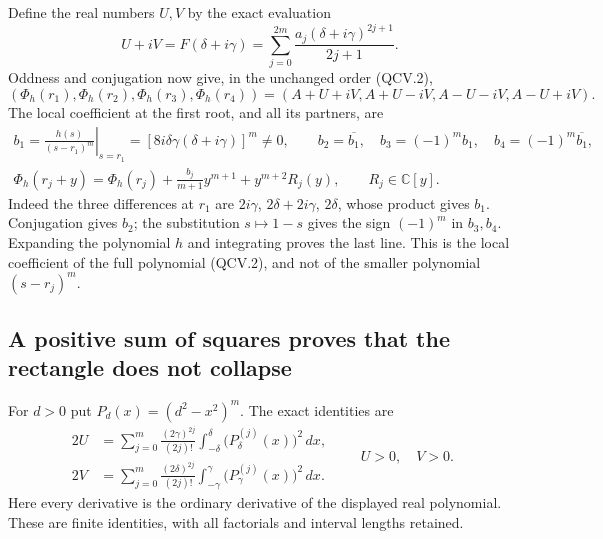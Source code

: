 Define the real numbers \(U,V\) by the exact evaluation
\[
 U+iV=F(\delta+i\gamma)
     =\sum_{j=0}^{2m}\frac{a_j(\delta+i\gamma)^{2j+1}}{2j+1}.
 \tag{QCV.7}
\]
Oddness and conjugation now give, in the unchanged order (QCV.2),
\[
 (\Phi_h(r_1),\Phi_h(r_2),\Phi_h(r_3),\Phi_h(r_4))
   =(A+U+iV,A+U-iV,A-U-iV,A-U+iV).
 \tag{QCV.8}
\]
The local coefficient at the first root, and all its partners, are
\[
 \begin{gathered}
 b_1=\left.\frac{h(s)}{(s-r_1)^m}\right|_{s=r_1}
       =[8i\delta\gamma(\delta+i\gamma)]^m\ne0,\qquad
 b_2=\overline{b_1},\quad b_3=(-1)^m b_1,
       \quad b_4=(-1)^m\overline{b_1},\\
 \Phi_h(r_j+y)=\Phi_h(r_j)
          +\frac{b_j}{m+1}y^{m+1}+y^{m+2}R_j(y),
       \qquad R_j\in\mathbb{C}[y].
 \end{gathered}
 \tag{QCV.9}
\]
Indeed the three differences at \(r_1\) are \(2i\gamma\),
\(2\delta+2i\gamma\), \(2\delta\), whose product gives \(b_1\).
Conjugation gives \(b_2\); the substitution \(s\mapsto1-s\) gives
the sign \((-1)^m\) in \(b_3,b_4\). Expanding the polynomial \(h\)
and integrating proves the last line. This is the local coefficient
of the full polynomial (QCV.2), and not of the smaller polynomial
\((s-r_j)^m\).

\subsection{A positive sum of squares proves that the rectangle does not collapse}

For \(d>0\) put \(P_d(x)=(d^2-x^2)^m\). The exact identities are
\[
 \boxed{\begin{aligned}
 2U&=\sum_{j=0}^{m}\frac{(2\gamma)^{2j}}{(2j)!}
         \int_{-\delta}^{\delta}\bigl(P_\delta^{(j)}(x)\bigr)^2\,dx,\\
 2V&=\sum_{j=0}^{m}\frac{(2\delta)^{2j}}{(2j)!}
         \int_{-\gamma}^{\gamma}\bigl(P_\gamma^{(j)}(x)\bigr)^2\,dx.
 \end{aligned}}
 \qquad U>0,\quad V>0.
 \tag{QCV.10}
\]
Here every derivative is the ordinary derivative of the displayed
real polynomial. These are finite identities, with all factorials
and interval lengths retained.

